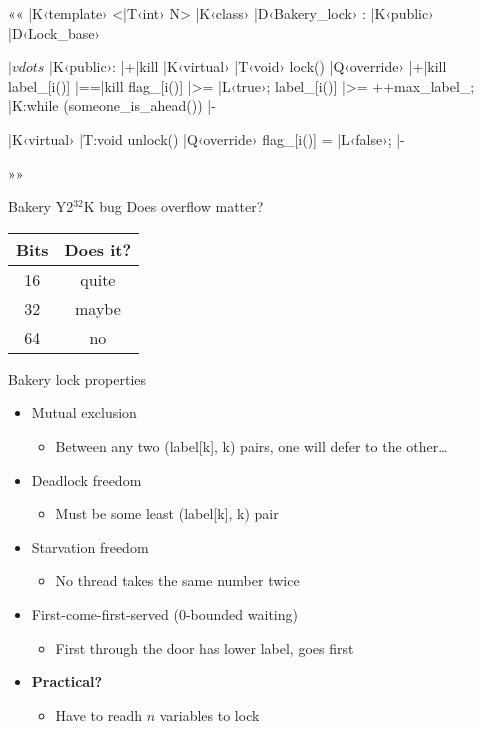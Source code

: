 \documentclass{beamer}
\begin{document}
\begin{frame}[fragile]{}{}
  ««
  |K‹template› <|T‹int› N>
  |K‹class› |D‹Bakery_lock› : |K‹public› |D‹Lock_base›
  {
  $|vdots$
  |K‹public›:
  	|+|kill%
    |K‹virtual› |T‹void› lock() |Q‹override›
    {
    	|+|kill%
      label_[i()] |==|kill%
      flag_[i()]  |>= |L‹true›;
      label_[i()] |>= ++max_label_;
      |K:while (someone_is_ahead()) {} |-
    }
    
    |K‹virtual› |T:void unlock() |Q‹override›
    { flag_[i()] = |L‹false›; } |-
  }
  »»
\end{frame}

\begin{frame}{Bakery Y2$^{\text{32}}$K bug}{}
  Does overflow matter?

  \centering
  \begin{tabular}{|c|c|}
    \hline
    \textbf{Bits} & \textbf{Does it?} \\
    \hline
    \hline
    16 & quite \\
    32 & maybe \\
    64 & no \\
    \hline
  \end{tabular}
\end{frame}

\begin{frame}{Bakery lock properties}
  \begin{itemize}
    \item Mutual exclusion
      \begin{itemize}
        \item Between any two (label[k], k) pairs, one will defer to the
          other\ldots
      \end{itemize}
    \item Deadlock freedom
      \begin{itemize}
        \item Must be some least (label[k], k) pair
      \end{itemize}
    \item Starvation freedom
      \begin{itemize}
        \item No thread takes the same number twice
      \end{itemize}
    \item First-come-first-served (0-bounded waiting)
      \begin{itemize}
        \item First through the door has lower label, goes first
      \end{itemize}
      \pause
    \item \textbf{Practical?}
      \begin{itemize}
        \item Have to readh $n$ variables to lock
      \end{itemize}
  \end{itemize}
\end{frame}
\end{document}
